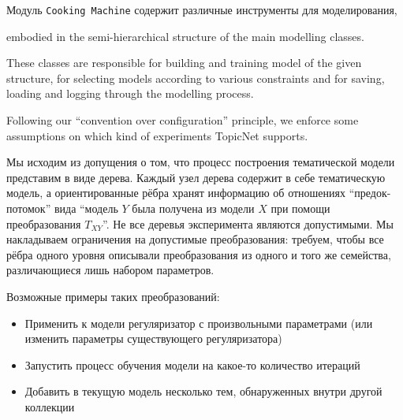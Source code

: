 Модуль \texttt{Cooking Machine} содержит различные инструменты для моделирования,

embodied in the semi-hierarchical structure of the main modelling classes.

These classes are responsible for building and training model of the given structure, for selecting models according to various constraints and for saving, loading and logging through the modelling process.  

Following our ``convention over configuration'' principle, we enforce some assumptions on which kind of experiments TopicNet supports.

Мы исходим из допущения о том, что процесс построения тематической модели представим в виде дерева. Каждый узел дерева содержит в себе тематическую модель, а ориентированные рёбра хранят информацию об отношениях ``предок-потомок'' вида ``модель $Y$ была получена из модели $X$ при помощи преобразования $T_{XY}$''. Не все деревья эксперимента являются допустимыми. Мы накладываем ограничения на допустимые преобразования: требуем, чтобы все рёбра одного уровня описывали преобразования из одного и того же семейства, различающиеся лишь набором параметров.  

Возможные примеры таких преобразований: 

\begin{itemize}

    \item Применить к модели регуляризатор с произвольными параметрами (или изменить параметры существующего регуляризатора)

    \item Запустить процесс обучения модели на какое-то количество итераций

    \item Добавить в текущую модель несколько тем, обнаруженных внутри другой коллекции

\end{itemize} 


